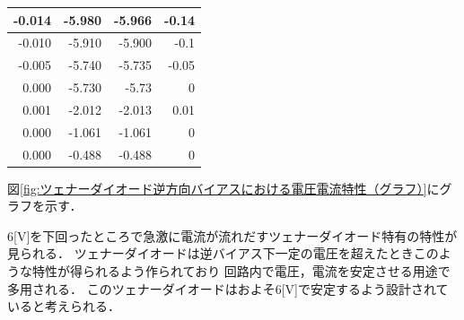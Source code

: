 \documentclass[titlepage]{jarticle}
\begin{document}
\begin{table}[htbp]
\begin{center}
\begin{tabular}{r|r|r|r}
            -0.014                                   & -5.980                          & -5.966                                            & -0.14                        \\ \hline
            -0.010                                   & -5.910                          & -5.900                                            & -0.1                         \\ \hline
            -0.005                                   & -5.740                          & -5.735                                            & -0.05                        \\ \hline
            0.000                                    & -5.730                          & -5.73                                             & 0                            \\ \hline
            0.001                                    & -2.012                          & -2.013                                            & 0.01                         \\ \hline
            0.000                                    & -1.061                          & -1.061                                            & 0                            \\ \hline
            0.000                                    & -0.488                          & -0.488                                            & 0                            \\ \hline
        \end{tabular}
    \end{center}
    \label{ツェナーダイオード逆方向バイアスにおける電圧電流特性測定結果}
\end{table}

図\ref{fig:ツェナーダイオード逆方向バイアスにおける電圧電流特性（グラフ）}にグラフを示す．

6[V]を下回ったところで急激に電流が流れだすツェナーダイオード特有の特性が見られる．
ツェナーダイオードは逆バイアス下一定の電圧を超えたときこのような特性が得られるよう作られており
回路内で電圧，電流を安定させる用途で多用される．
このツェナーダイオードはおよそ6[V]で安定するよう設計されていると考えられる．
\end{document}

